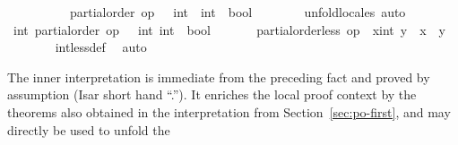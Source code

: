 \begin{isabellebody}
\ \ \isamarkupfalse%
\ {}\isanewline
\ \ \ \ \isamarkupfalse%
\ {}partial{}order\ {}op\ {}\ {}{}\ int\ {}\ int\ {}\ bool{}{}\isanewline
\ \ \ \ \ \ \isamarkupfalse%
\ unfold{}locales\ auto\isanewline
\ \ \ \ \isamarkupfalse%
\ \isamarkupfalse%
\ int{}\ partial{}order\ {}op\ {}\ {}{}\ {}int{}\ int{}\ {}\ bool{}\ \isamarkupfalse%
\isanewline
\ \ \ \ \isamarkupfalse%
\ {}partial{}order{}less\ op\ {}\ {}x{}{}int{}\ y\ {}\ {}x\ {}\ y{}{}\isanewline
\ \ \ \ \ \ \isamarkupfalse%
\ int{}less{}def\ \isamarkupfalse%
\ auto\isanewline
\ \ \isamarkupfalse%
%
\endisatagvisible
{\isafoldvisible}%
%
\isadelimvisible
%
\endisadelimvisible
%
\begin{isamarkuptext}%
The inner interpretation is immediate from the preceding fact
  and proved by assumption (Isar short hand ``.'').  It enriches the
  local proof context by the theorems
  also obtained in the interpretation from Section~\ref{sec:po-first},
  and  may directly be used to unfold the

\end{isamarkuptext}
\end{isabellebody}
